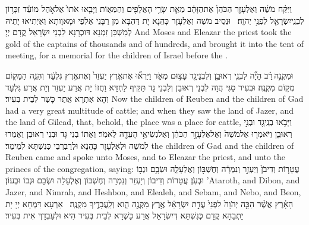 {וַיִּקַּ֨ח מֹשֶׁ֜ה וְאֶלְעָזָ֤ר הַכֹּהֵן֙ אֶת\maqqaf הַזָּהָ֔ב מֵאֵ֛ת שָׂרֵ֥י הָאֲלָפִ֖ים וְהַמֵּא֑וֹת וַיָּבִ֤אוּ אֹתוֹ֙ אֶל\maqqaf אֹ֣הֶל מוֹעֵ֔ד זִכָּר֥וֹן לִבְנֵֽי\maqqaf יִשְׂרָאֵ֖ל לִפְנֵ֥י יְהֹוָֽה׃ \petucha }
{וּנְסֵיב מֹשֶׁה וְאֶלְעָזָר כָּהֲנָא יָת דַּהְבָּא מִן רַבָּנֵי אַלְפֵי וּמָאוָותָא וְאֵיְתִיאוּ יָתֵיהּ לְמַשְׁכַּן זִמְנָא דּוּכְרָנָא לִבְנֵי יִשְׂרָאֵל קֳדָם יְיָ׃}
{And Moses and Eleazar the priest took the gold of the captains of thousands and of hundreds, and brought it into the tent of meeting, for a memorial for the children of Israel before the \lord.}{}

\newperek
{}
{וּמִקְנֶ֣ה \legarmeh  רַ֗ב הָיָ֞ה לִבְנֵ֧י רְאוּבֵ֛ן וְלִבְנֵי\maqqaf גָ֖ד עָצ֣וּם מְאֹ֑ד וַיִּרְא֞וּ אֶת\maqqaf אֶ֤רֶץ יַעְזֵר֙ וְאֶת\maqqaf אֶ֣רֶץ גִּלְעָ֔ד וְהִנֵּ֥ה הַמָּק֖וֹם מְק֥וֹם מִקְנֶֽה׃}
{וּבְעִיר סַגִּי הֲוָה לִבְנֵי רְאוּבֵן וְלִבְנֵי גָּד תַּקִּיף לַחְדָּא וַחֲזוֹ יָת אֲרַע יַעְזֵר וְיָת אֲרַע גִּלְעָד וְהָא אַתְרָא אֲתַר כָּשַׁר לְבֵית בְּעִיר׃}
{Now the children of Reuben and the children of Gad had a very great multitude of cattle; and when they saw the land of Jazer, and the land of Gilead, that, behold, the place was a place for cattle,}{}
{וַיָּבֹ֥אוּ בְנֵֽי\maqqaf גָ֖ד וּבְנֵ֣י רְאוּבֵ֑ן וַיֹּאמְר֤וּ אֶל\maqqaf מֹשֶׁה֙ וְאֶל\maqqaf אֶלְעָזָ֣ר הַכֹּהֵ֔ן וְאֶל\maqqaf נְשִׂיאֵ֥י הָעֵדָ֖ה לֵאמֹֽר׃}
{וַאֲתוֹ בְנֵי גָּד וּבְנֵי רְאוּבֵן וַאֲמַרוּ לְמֹשֶׁה וּלְאֶלְעָזָר כָּהֲנָא וּלְרַבְרְבֵי כְּנִשְׁתָּא לְמֵימַר׃}
{the children of Gad and the children of Reuben came and spoke unto Moses, and to Eleazar the priest, and unto the princes of the congregation, saying:}{}
{עֲטָר֤וֹת וְדִיבֹן֙ וְיַעְזֵ֣ר וְנִמְרָ֔ה וְחֶשְׁבּ֖וֹן וְאֶלְעָלֵ֑ה וּשְׂבָ֥ם וּנְב֖וֹ וּבְעֹֽן׃}
{עֲטָרוֹת וְדִיבוֹן וְיַעְזֵר וְנִמְרָה וְחֶשְׁבּוֹן וְאֶלְעָלֵה וּשְׂבָם וּנְבוֹ וּבְעוֹן׃}
{’Ataroth, and Dibon, and Jazer, and Nimrah, and Heshbon, and Elealeh, and Sebam, and Nebo, and Beon,}{}
{הָאָ֗רֶץ אֲשֶׁ֨ר הִכָּ֤ה יְהֹוָה֙ לִפְנֵי֙ עֲדַ֣ת יִשְׂרָאֵ֔ל אֶ֥רֶץ מִקְנֶ֖ה הִ֑וא וְלַֽעֲבָדֶ֖יךָ מִקְנֶֽה׃ \setuma }
{אַרְעָא דִּמְחָא יְיָ יָת יָתְבַהָא קֳדָם כְּנִשְׁתָּא דְּיִשְׂרָאֵל אֲרַע כָּשְׁרָא לְבֵית בְּעִיר הִיא וּלְעַבְדָךְ אִית בְּעִיר׃}

